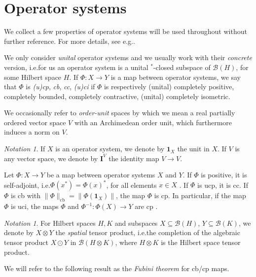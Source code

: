 \documentclass{amsart}
\theoremstyle{plain}
\theoremstyle{definition}
\theoremstyle{remark}
\newtheorem{notation}[theorem]{Notation}
\begin{document}
	
	\section{Operator systems}\label{sec:Operator-systems}
	
	We collect a few properties of operator systems will be used throughout without further reference.
	For more details, see e.g.\@ \cite{Pau02}.
	
	We only consider \emph{unital} operator systems and we usually work with their \emph{concrete} version, i.e.\@ for us an operator system is a unital $^*$-closed subspace of $\mathcal{B}(H)$, for some Hilbert space $H$.
	If $\Phi : X \rightarrow Y$ is a map between operator systems, we say that $\Phi$ is \emph{(u)cp}, \emph{cb}, \emph{cc}, \emph{(u)ci} if $\Phi$ is respectively (unital) completely positive, completely bounded, completely contractive, (unital) completely isometric.
	
	We occasionally refer to \emph{order-unit} spaces by which we mean a real partially ordered vector space $V$ with an Archimedean order unit, which furthermore induces a norm on $V$.
	
	\begin{notation}
		If $X$ is an operator system, we denote by $\mathbf{1}_X$ the unit in $X$.
		If $V$ is any vector space, we denote by $\mathbf{I}^V$ the identity map $V \rightarrow V$.
	\end{notation}
	
	Let $\Phi : X \rightarrow Y$ be a map between operator systems $X$ and $Y$.
	If $\Phi$ is positive, it is self-adjoint, i.e.\@ $\Phi(x^*) = \Phi(x)^*$, for all elements $x \in X$ \cite[Exercise 2.1]{Pau02}.
	If $\Phi$ is ucp, it is cc.
	If $\Phi$ is cb with $\lVert \Phi\rVert_\mathrm{cb} = \lVert\Phi(\mathbf{1}_X)\rVert$, the map $\Phi$ is cp.
	In particular, if the map $\Phi$ is uci, the maps $\Phi$ and $\Phi^{-1} : \Phi(X) \rightarrow Y$ are cp \cite[Proposition 3.5]{Pau02}.
	
	\begin{notation}\label{not:Spatial-tensor-product}
		For Hilbert spaces $H, K$ and subspaces $X \subseteq \mathcal{B}(H)$, $Y \subseteq \mathcal{B}(K)$, we denote by $X \otimes Y$ the \emph{spatial} tensor product, i.e.\@ the completion of the algebraic tensor product $X \odot Y$ in $\mathcal{B}(H \otimes K)$, where $H \otimes K$ is the Hilbert space tensor product.
	\end{notation}
	
	We will refer to the following result as the \emph{Fubini theorem} for cb/cp maps.
	
\end{document}
